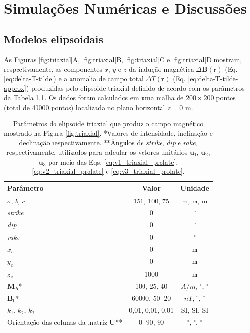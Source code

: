 \chapter{Simulações Numéricas e Discussões}

\section{Modelos elipsoidais}

As Figuras \ref{fig:triaxial}A, \ref{fig:triaxial}B, \ref{fig:triaxial}C e \ref{fig:triaxial}D mostram, respectivamente, as componentes $x$, $y$ e $z$ da indução magnética $\Delta \mathbf{B}(\mathbf{r})$ (Eq. \ref{eq:delta-T-tilde}) e a
anomalia de campo total $\Delta T (\mathbf{r})$ (Eq. \ref{eq:delta-T-tilde-approx}) produzidas pelo elipsoide triaxial definido de acordo com os parâmetros da Tabela \ref{tab:triaxial}.
Os dados foram calculados em uma malha de $200 \times 200$ pontos (total de 40000 pontos) localizada no plano horizontal $z = 0$ m.

\begin{table}[h]
	\begin{center}
		\begin{tabular}{|l|c|c|}
			\hline
			\textbf{Parâmetro}  & \textbf{Valor}  & \textbf{Unidade} \\
			\hline 
			$a$, $b$, $c$   & 150, 100, 75 & m, m, m\\
			\hline
			\textit{strike}   & $0$ & $^{\circ}$\\
			\hline
			\textit{dip} & $0$ & $^{\circ}$\\
			\hline
			\textit{rake} & $0$  & $^{\circ}$\\
			\hline
			$x_{c}$   & 0  & m\\
			\hline          
			$y_{c}$   & 0  & m\\
			\hline                
			$z_{c}$   & 1000 & m\\
			\hline
			$\mathbf{M}_{R}$*  & 100, $25$, $40$  & $A/m$, $^{\circ}$, $^{\circ}$\\
			\hline
			$\mathbf{B}_{0}$*    & 60000, $50$, $20$ & $nT$, $^{\circ}$, $^{\circ}$\\
			\hline
			$k_{1}$, $k_{2}$, $k_{3}$   & 0,01, 0,01, 0,01  & SI, SI, SI\\
			\hline
			Orientação das colunas da matriz $\mathbf{U}$**   & $0$, $90$, $90$  & $^{\circ}$, $^{\circ}$, $^{\circ}$\\
			\hline
		\end{tabular}
		\caption{Parâmetros do elipsoide triaxial que produz o campo magnético mostrado na Figura \ref{fig:triaxial}. *Valores de intensidade, inclinação e declinação respectivamente. **Ângulos de \textit{strike}, \textit{dip}  e \textit{rake}, respectivamente, utilizados para calcular os vetores unitários $\mathbf{u}_{1}$, $\mathbf{u}_{2}$, $\mathbf{u}_{3}$ por meio das Eqs. \ref{eq:v1_triaxial_prolate}, \ref{eq:v2_triaxial_prolate} e \ref{eq:v3_triaxial_prolate}.}
	\end{center}
	\label{tab:triaxial}
\end{table}
\newpage

